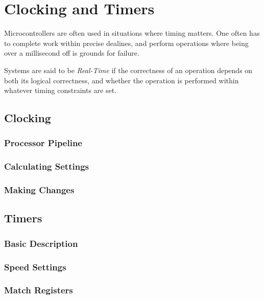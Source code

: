 \documentclass[]{article}
\begin{document}
\newpage

\section{Clocking and Timers}

Microcontrollers are often used in situations where timing matters. One
often has to complete work within precise dealines, and perform
operations where being over a millisecond off is grounds for failure.

Systems are said to be \emph{Real-Time} if the correctness of an
operation depends on both its logical correctness, and whether the
operation is performed within whatever timing constraints are set.

\subsection{Clocking}

\subsubsection{Processor Pipeline}

\subsubsection{Calculating Settings}

\subsubsection{Making Changes}

\subsection{Timers}

\subsubsection{Basic Description}

\subsubsection{Speed Settings}

\subsubsection{Match Registers}
\end{document}
